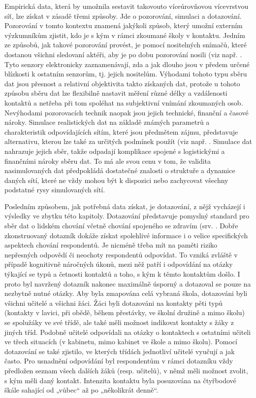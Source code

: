 Empirická data, která by umožnila sestavit takovouto víceúrovňovou vícevrstvou síť, lze získat v zásadě třemi způsoby. Jde o pozorování, simulaci a dotazování. Pozorování v tomto kontextu znamená jakýkoli způsob, který umožní externím výzkumníkům zjistit, kdo je s kým v rámci zkoumané školy v kontaktu. Jedním ze způsobů, jak takové pozorování provést, je pomocí nositelných snímačů, které dostanou všichni sledovaní aktéři, aby je po dobu pozorování nosili (viz např. \cite{stehle2011high, gemmetto2014mitigation}. Tyto senzory elektronicky zaznamenávají, zda a jak dlouho jsou v předem určené blízkosti k ostatním senzorům, tj. jejich nositelům. Výhodami tohoto typu sběru dat jsou přesnost a relativní objektivita takto získaných dat, protože u tohoto způsobu sběru dat lze flexibilně nastavit měření různé délky a vzdálenosti kontaktů a netřeba při tom spoléhat na subjektivní vnímání zkoumaných osob. Nevýhodami pozorovacích technik naopak jsou jejich technické, finanční a časové nároky. Simulace realistických dat na základě známých parametrů a charakteristik odpovídajících sítím, které jsou předmětem zájmu, představuje alternativu, kterou lze také za určitých podmínek použít (viz např. \cite{mcgee2021model, potter2012estimating}. Simulace dat nahrazuje jejich sběr, takže odpadají komplikace spojené s logistickými a finančními nároky sběru dat. To má ale svou cenu v tom, že validita nasimulovaných dat předpokládá dostatečné znalosti o struktuře a dynamice daných sítí, které ne vždy mohou být k dispozici nebo zachycovat všechny podstatné rysy simulovaných sítí.

Posledním způsobem, jak potřebná data získat, je dotazování, z nějž vycházejí i výsledky ve zbytku této kapitoly. Dotazování představuje pomyslný standard pro sběr dat o lidském chování včetně chování spojeného se zdravím (srv. \cite{danon2011networks, luke2007network, zaj:mossong2008social}. Dobře zkonstruovaný dotazník dokáže získat spolehlivé informace i o velice specifických aspektech chování respondentů. Je nicméně třeba mít na paměti riziko nepřesných odpovědí či neochoty respondentů odpovídat. To vzniká zvláště v případě kognitivně náročných úkonů, mezi něž patří i odpovídání na otázky týkající se typů a četnosti kontaktů a toho, s kým k těmto kontaktům došlo. I proto byl navržený dotazník nakonec maximálně úsporný a dotazoval se pouze na nezbytně nutné otázky. Aby byla zmapována celá vybraná škola, dotazováni byli všichni učitelé a všichni žáci. Žáci byli dotazováni na kontakty pěti typů (kontakty v lavici, při obědě, během přestávky, ve školní družině a mimo školu) se spolužáky ve své třídě, ale také měli možnost indikovat kontakty s žáky z jiných tříd. Podobně učitelé odpovídali na otázky o kontaktech s ostatními učiteli ve třech situacích (v kabinetu, mimo kabinet ve škole a mimo školu). Pomocí dotazování se také zjistilo, ve kterých třídách jednotliví učitelé vyučují a jak často. Pro usnadnění odpovídání byl respondentům v rámci dotazníku vždy předložen seznam všech dalších žáků (resp. učitelů), v němž měli možnost zvolit, s kým měli daný kontakt. Intenzita kontaktu byla posuzována na čtyřbodové škále sahající od „vůbec“ až po „několikrát denně“.



